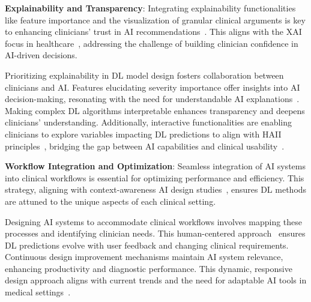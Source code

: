 \vspace{2.00mm}

\noindent
\textcolor{revised}{{\bf Explainability and Transparency}:
Integrating explainability functionalities like feature importance and the visualization of granular clinical arguments is key to enhancing clinicians' trust in \ac{AI} recommendations~\cite{10.1007/978-3-030-50334-5_4}.
This aligns with the \ac{XAI} focus in healthcare~\cite{EVANS2022281}, addressing the challenge of building clinician confidence in AI-driven decisions.}

\vspace{2.00mm}

\textcolor{revised}{Prioritizing explainability in \ac{DL} model design fosters collaboration between clinicians and \ac{AI}.
Features elucidating severity importance offer insights into \ac{AI} decision-making, resonating with the need for understandable \ac{AI} explanations~\cite{10.1145/2939672.2939778}.
Making complex \ac{DL} algorithms interpretable enhances transparency and deepens clinicians' understanding.
Additionally, interactive functionalities are enabling clinicians to explore variables impacting \ac{DL} predictions to align with \ac{HAII} principles~\cite{10.1145/3290605.3300233}, bridging the gap between \ac{AI} capabilities and clinical usability~\cite{Tyllinen:2016:WNN:2858036.2858570}.}

\vspace{2.00mm}

\noindent
\textcolor{revised}{{\bf Workflow Integration and Optimization}:
Seamless integration of \ac{AI} systems into clinical workflows is essential for optimizing performance and efficiency.
This strategy, aligning with context-awareness \ac{AI} design studies~\cite{10.1145/3173574.3174156}, ensures \ac{DL} methods are attuned to the unique aspects of each clinical setting.}


\textcolor{revised}{Designing \ac{AI} systems to accommodate clinical workflows involves mapping these processes and identifying clinician needs.
This human-centered approach~\cite{10.1145/3313831.3376718} ensures \ac{DL} predictions evolve with user feedback and changing clinical requirements.
Continuous design improvement mechanisms maintain \ac{AI} system relevance, enhancing productivity and diagnostic performance.
This dynamic, responsive design approach aligns with current trends and the need for adaptable \ac{AI} tools in medical settings~\cite{10.1145/3290605.3300233}.}


